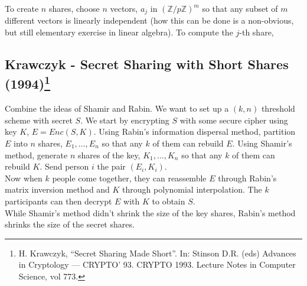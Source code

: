 \documentclass[12pt]{article}
\newcommand{\integers}{\mathbb{Z}}
\begin{document}
\noindent To create $n$ shares, choose $n$ vectors, $a_j$ in $(\integers/p\integers)^m$ so that any subset of $m$ different vectors is linearly independent (how this can be done is a non-obvious, but still elementary exercise in linear algebra). To compute the $j$-th share, 

\subsection*{Krawczyk - Secret Sharing with Short Shares (1994)\footnote{H. Krawczyk, ``Secret Sharing Made Short''. In: Stinson D.R. (eds) Advances in Cryptology — CRYPTO’ 93. CRYPTO 1993. Lecture Notes in Computer Science, vol 773.}}
Combine the ideas of Shamir and Rabin. We want to set up a $(k,n)$ threshold scheme with secret $S$. We start by encrypting $S$ with some secure cipher using key $K$, $E = Enc(S, K)$. Using Rabin's information dispersal method, partition $E$ into $n$ shares, $E_1, \ldots, E_n$ so that any $k$ of them can rebuild $E$. Using Shamir's method, generate $n$ shares of the key, $K_1, \ldots, K_n$ so that any $k$ of them can rebuild $K$. Send person $i$ the pair $(E_i, K_i)$.\\

\noindent Now when $k$ people come together, they can reassemble $E$ through Rabin's matrix inversion method and $K$ through polynomial interpolation. The $k$ participants can then decrypt $E$ with $K$ to obtain $S$.\\

\noindent While Shamir's method didn't shrink the size of the key shares, Rabin's method shrinks the size of the secret shares.



\end{document}

